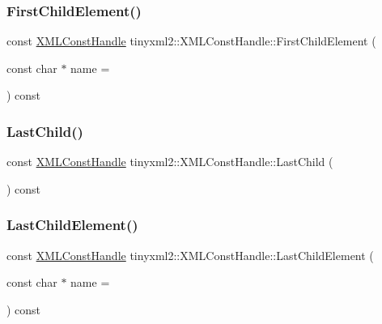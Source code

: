 \subsubsection{\texorpdfstring{First\+Child\+Element()}{FirstChildElement()}}
{\footnotesize\ttfamily const \mbox{\hyperlink{classtinyxml2_1_1_x_m_l_const_handle}{X\+M\+L\+Const\+Handle}} tinyxml2\+::\+X\+M\+L\+Const\+Handle\+::\+First\+Child\+Element (\begin{DoxyParamCaption}\item[{const char $\ast$}]{name = {} }\end{DoxyParamCaption}) const\hspace{0.3cm}{\ttfamily [inline]}}

\mbox{\label{classtinyxml2_1_1_x_m_l_const_handle_a908436124990f3d7b35cb7df20d31d9e}} 
\subsubsection{\texorpdfstring{Last\+Child()}{LastChild()}}
{\footnotesize\ttfamily const \mbox{\hyperlink{classtinyxml2_1_1_x_m_l_const_handle}{X\+M\+L\+Const\+Handle}} tinyxml2\+::\+X\+M\+L\+Const\+Handle\+::\+Last\+Child (\begin{DoxyParamCaption}{ }\end{DoxyParamCaption}) const\hspace{0.3cm}{\ttfamily [inline]}}

\mbox{\label{classtinyxml2_1_1_x_m_l_const_handle_a9de0475ec42bd50c0e64624a250ba5b2}} 
\subsubsection{\texorpdfstring{Last\+Child\+Element()}{LastChildElement()}}
{\footnotesize\ttfamily const \mbox{\hyperlink{classtinyxml2_1_1_x_m_l_const_handle}{X\+M\+L\+Const\+Handle}} tinyxml2\+::\+X\+M\+L\+Const\+Handle\+::\+Last\+Child\+Element (\begin{DoxyParamCaption}\item[{const char $\ast$}]{name = {} }\end{DoxyParamCaption}) const\hspace{0.3cm}{\ttfamily [inline]}}

